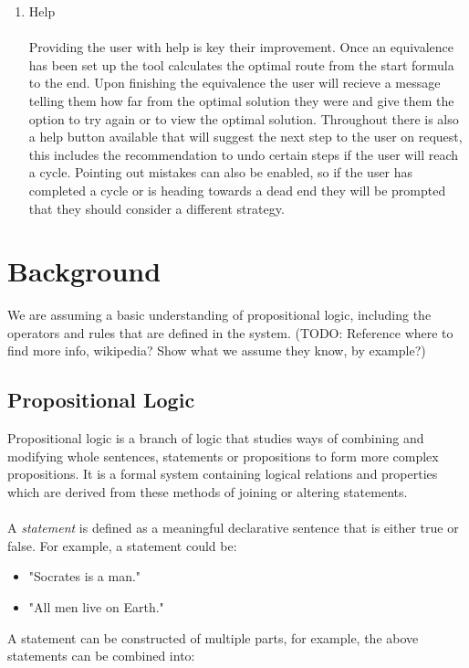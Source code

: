 \documentclass{report}
\begin{document}
\begin{enumerate}
\item Help
\\\\Providing the user with help is key their improvement. Once an equivalence has been set up the tool calculates the optimal route from the start formula to the end. Upon finishing the equivalence the user will recieve a message telling them how far from the optimal solution they were and give them the option to try again or to view the optimal solution. Throughout there is also a help button available that will suggest the next step to the user on request, this includes the recommendation to undo certain steps if the user will reach a cycle. Pointing out mistakes can also be enabled, so if the user has completed a cycle or is heading towards a dead end they will be prompted that they should consider a different strategy.

\end{enumerate}


\chapter{Background}

We are assuming a basic understanding of propositional logic, including the operators and rules that are defined in the system. (TODO: Reference where to find more info, wikipedia? Show what we assume they know, by example?)

\section{Propositional Logic}

Propositional logic is a branch of logic that studies ways of combining and modifying whole sentences, statements or propositions to form more complex propositions. It is a formal system containing logical relations and properties which are derived from these methods of joining or altering statements.
\\\\
A \textit{statement} is defined as a meaningful declarative sentence that is either true or false. For example, a statement could be: 

\begin{itemize}
\item "Socrates is a man."
\item "All men live on Earth."
\end{itemize}
A statement can be constructed of multiple parts, for example, the above statements can be combined into:
\end{document}
